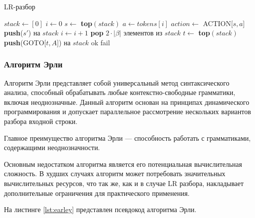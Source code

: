 \documentclass[14pt, russian]{scrartcl}
\begin{document}
\begin{listing}[H]
	\caption{LR-разбор}
	\label{lst:lr}
\begin{algorithm}[H]
	\begin{algorithmic}[1]
	  \State $stack \gets [0]$
	  \State $i \gets 0$
		\State $s \gets$ \textbf{top}$(stack)$
		\State $a \gets tokens[i]$
		\State $action \gets$ ACTION[$s, a$]
		  \State \textbf{push}($s'$) на $stack$
		  \State $i \gets i + 1$
		  \State \textbf{pop} $2\cdot |\beta|$ элементов из $stack$
		  \State $t \gets$ \textbf{top}$(stack)$
		  \State \textbf{push}(GOTO[$t, A$]) на $stack$
		  \State \Return ok
		\Else
		  \State \Return fail
		\EndIf
	  \EndWhile
	\EndProcedure
	\end{algorithmic}
	\end{algorithm}
\end{listing}

\subsubsection{Алгоритм Эрли}

\label{sec:earleyint}

Алгоритм Эрли\cite{earley} представляет собой универсальный метод синтаксического анализа, способный обрабатывать любые
контекстно-свободные грамматики, включая неоднозначные. Данный алгоритм основан на принципах динамического
программирования и допускает параллельное рассмотрение нескольких вариантов разбора входной строки.

Главное преимущество алгоритма Эрли --- способность работать с грамматиками, содержащими неоднозначности.

Основным недостатком алгоритма является его потенциальная вычислительная сложность. В худших случаях алгоритм
может потребовать значительных вычислительных ресурсов, что так же, как и в случае LR разбора, накладывает
дополнительные ограничения для практического применения.


На листинге \ref{lst:earley} представлен псевдокод алгоритма Эрли.
\end{document}
